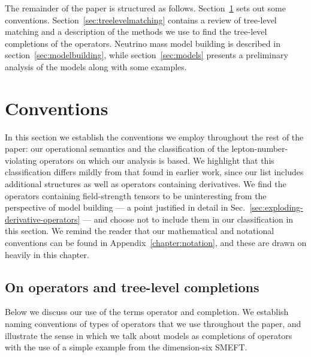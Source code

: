 The remainder of the paper is structured as follows.
Section~\ref{sec:conventions} sets out some conventions.
Section~\ref{sec:treelevelmatching} contains a review of tree-level matching and
a description of the methods we use to find the tree-level completions of the
operators. Neutrino mass model building is described in
section~\ref{sec:modelbuilding}, while section~\ref{sec:models} presents a
preliminary analysis of the models along with some examples.

\section{Conventions}
\label{sec:conventions}

In this section we establish the conventions we employ throughout the rest of
the paper: our operational semantics and the classification of the
lepton-number-violating operators on which our analysis is based. We highlight
that this classification differs mildly from that found in earlier work, since
our list includes additional structures as well as operators containing
derivatives. We find the operators containing field-strength tensors to be
uninteresting from the perspective of model building --- a point justified in
detail in Sec.~\ref{sec:exploding-derivative-operators} --- and choose not to
include them in our classification in this section. We remind the reader that
our mathematical and notational conventions can be found in
Appendix~\ref{chapter:notation}, and these are drawn on heavily in this chapter.

\subsection{On operators and tree-level completions}
\label{sec:operatorsandcompletions}

Below we discuss our use of the terms operator and completion. We establish
naming conventions of types of operators that we use throughout the paper, and
illustrate the sense in which we talk about models as completions of operators
with the use of a simple example from the dimension-six SMEFT.

